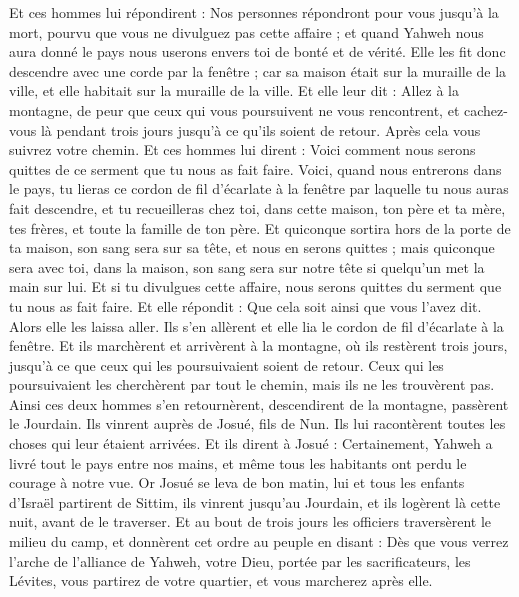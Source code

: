 \begin{multicols}{2}
Et ces hommes lui répondirent : Nos personnes répondront pour vous jusqu'à la mort, pourvu que vous ne divulguez pas  cette affaire ; et quand Yahweh nous aura donné le pays nous userons envers toi de bonté et de vérité. 
Elle les fit donc descendre avec une corde par la fenêtre ; car sa maison était sur la muraille de la ville, et elle habitait sur la muraille de la ville. 
Et elle leur dit : Allez à la montagne, de peur que ceux qui vous poursuivent ne vous rencontrent, et cachez-vous là pendant trois jours jusqu'à ce qu'ils soient de retour. Après cela vous suivrez votre chemin.
Et ces hommes lui dirent : Voici comment nous serons quittes de ce serment que tu nous as fait faire.
Voici, quand nous entrerons dans le pays, tu lieras ce cordon de fil d'écarlate à la fenêtre par laquelle tu nous auras fait descendre, et tu recueilleras chez toi, dans cette maison, ton père et ta mère, tes frères, et toute la famille de ton père.
Et quiconque sortira hors de la porte de ta maison, son sang sera sur sa tête, et nous en serons quittes ; mais quiconque sera avec toi, dans la maison, son sang sera sur notre tête si quelqu'un met la main sur lui.
Et si tu divulgues cette affaire, nous serons quittes du serment que tu nous as fait faire.
Et elle répondit : Que cela soit ainsi que vous l'avez dit. Alors elle les laissa aller. Ils s'en allèrent et elle lia le cordon de fil d'écarlate à la fenêtre.
Et ils marchèrent et arrivèrent à la montagne, où ils restèrent trois jours, jusqu'à ce que ceux qui les poursuivaient soient de retour. Ceux qui les poursuivaient les cherchèrent par tout le chemin, mais ils ne les trouvèrent pas.
Ainsi ces deux hommes s'en retournèrent, descendirent de la montagne, passèrent le Jourdain. Ils vinrent auprès de Josué, fils de Nun. Ils lui racontèrent toutes les choses qui leur étaient arrivées.
Et ils dirent à Josué : Certainement, Yahweh a livré tout le pays entre nos mains, et même tous les habitants ont perdu le courage à notre vue.
\VerseOne{}Or Josué se leva de bon matin, lui et tous les enfants d'Israël partirent de Sittim, ils vinrent jusqu'au Jourdain, et ils logèrent là cette nuit, avant de le traverser.
Et au bout de trois jours les officiers traversèrent le milieu du camp,
et donnèrent cet ordre au peuple en disant : Dès que vous verrez l'arche de l'alliance de Yahweh, votre Dieu, portée par les sacrificateurs, les Lévites, vous partirez de votre quartier, et vous marcherez après elle.

\end{multicols}
